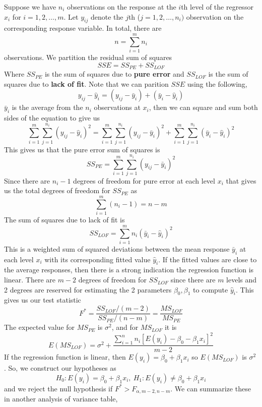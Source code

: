 Suppose we have $n_i$ observations on the response at the $i$th level of the regressor $x_i$ for $i = 1, 2, \ldots, m$. Let $y_{ij}$ denote the $j$th ($j = 1,2,\ldots, n_i)$ observation on the corresponding response variable. In total, there are 
\[n = \sum_{i=1}^m n_i\]
observations. We partition the residual sum of squares 
\[SSE = SS_{PE} + SS_{LOF}\]
Where $SS_{PE}$ is the sum of squares due to \textbf{pure error}  and $SS_{LOF}$ is the sum of squares due to \textbf{lack of fit}. Note that we can parition $SSE$ using the following, 
\[y_{ij} - \hat{y}_i = (y_{ij} - \bar{y}_i) + (\bar{y}_i - \hat{y}_i)\]
$\bar{y}_i$ is the average from the $n_i$ observations at $x_i$, then we can square and sum both sides of the equation to give us 
\[\sum_{i=1}^m \sum_{j=1}^{n_i} (y_{ij} - \hat{y}_i)^2 = \sum_{i=1}^m \sum_{j=1}^{n_i}(y_{ij} - \bar{y}_i)^2 + \sum_{i=1}^m \sum_{j=1}^{n_i}(\bar{y}_i - \hat{y}_i)^2\]
This gives us that the pure error sum of squares is 
\[SS_{PE} =\sum_{i=1}^m \sum_{j=1}^{n_i} (y_{ij} - \bar{y}_i)^2\]
Since there are $n_i - 1$ degrees of freedom for pure error at each level $x_i$ that gives us the total degrees of freedom for $SS_{PE}$ as 
\[\sum_{i=1}^m (n_i - 1) = n-m\]
The sum of squares due to lack of fit is 
\[SS_{LOF} = \sum_{i=1}^m n_i(\bar{y}_i - \hat{y}_i)^2\]
This is a weighted sum of squared deviations between the mean response $\bar{y}_i$ at each level $x_i$ with its corresponding fitted value $\hat{y}_i$. If the fitted values are close to the average responses, then there is a strong indication the regression function is linear. There are $m-2$ degrees of freedom for $SS_{LOF}$ since there are $m$ levels and 2 degrees are reserved for estimating the 2 parameters $\beta_0, \beta_1$ to compute $\hat{y}_i$. This gives us our test statistic 
\[F^* = \frac{SS_{LOF} / (m-2)}{SS_{PE} / (n-m)} = \frac{MS_{LOF}}{MS_{PE}}\]
The expected value for $MS_{PE}$ is $\sigma^2$, and for $MS_{LOF}$ it is 
\[E(MS_{LOF}) = \sigma^2 + \frac{\sum_{i=1}^n n_i \left[E(y_i) - \beta_0 - \beta_1x_i\right]^2}{m-2}\]
If the regression function is linear, then $E(y_i) = \beta_0 + \beta_1x_i$ so $E(MS_{LOF})$ is $\sigma^2$. So, we construct our hypotheses as 
\[H_0: E(y_i) = \beta_0 + \beta_1x_i, \ H_1: E(y_i) \neq \beta_0 + \beta_1x_i\]
and we reject the null hypothesis if $F^* > F_{\alpha, m-2, n-m}$. We can summarize these in another analysis of variance table,

